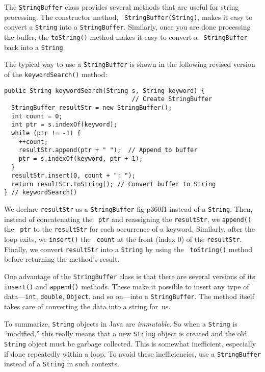 
\noindent The {\tt StringBuffer} class provides several methods that are useful
for string processing. The constructor method, {\tt
StringBuffer(String)}, makes it easy to convert a {\tt String} into a
{\tt StringBuffer}. Similarly, once you are done processing the
buffer, the {\tt toString()} method makes it easy to convert a {\tt
StringBuffer} back into a {\tt String}.

The typical way to use a {\tt StringBuffer} is shown in the following
revised version of the {\tt keywordSearch()} method:

\begin{jjjlisting}
\begin{lstlisting}
public String keywordSearch(String s, String keyword) {
                                   // Create StringBuffer
  StringBuffer resultStr = new StringBuffer(); 
  int count = 0;
  int ptr = s.indexOf(keyword);
  while (ptr != -1) {
    ++count;
    resultStr.append(ptr + " ");  // Append to buffer
    ptr = s.indexOf(keyword, ptr + 1);
  }
  resultStr.insert(0, count + ": ");
  return resultStr.toString(); // Convert buffer to String
} // keywordSearch()
\end{lstlisting}
\end{jjjlisting}

\noindent We declare {\tt resultStr} as a {\tt StringBuffer}
{fig-p360f1}
instead of a {\tt String}. Then, instead of concatenating the {\tt
ptr} and reassigning the {\tt resultStr}, we {\tt append()} the {\tt
ptr} to the {\tt resultStr} for each occurrence of a
keyword. Similarly, after the loop exits, we {\tt insert()} the {\tt
count} at the front (index 0) of the {\tt resultStr}. Finally, we
convert {\tt resultStr} into a {\tt String} by using the {\tt
toString()} method before returning the method's result.

One advantage of the {\tt StringBuffer} class is that there are several
versions of its {\tt insert()} and {\tt append()} methods.  These make
it possible to insert any type of data---{\tt int}, {\tt double},
{\tt Object}, and so on---into a {\tt StringBuffer}. The method itself
takes care of converting the data into a string for~us.


To summarize, {\tt String} objects in Java are {\it immutable}. So
when a {\tt String} is ``modified,'' this really means that a new {\tt String}
object is created and the old {\tt String} object must be garbage collected.
This is somewhat inefficient, especially if done repeatedly within a loop.
To avoid these inefficiencies, use a {\tt StringBuffer} instead of a {\tt String}
in such contexts.

